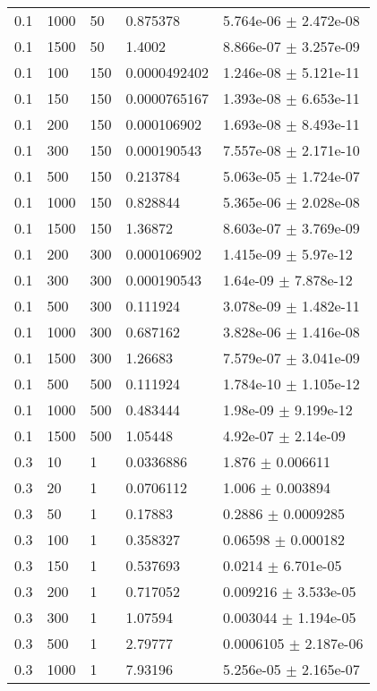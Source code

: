 \begin{longtable}{lllll}
 0.1 &  1000 &    50 & 0.875378 & 5.764e-06 $\pm$ 2.472e-08 \\
 0.1 &  1500 &    50 &   1.4002 & 8.866e-07 $\pm$ 3.257e-09 \\
 0.1 &   100 &   150 & 0.0000492402 & 1.246e-08 $\pm$ 5.121e-11 \\
 0.1 &   150 &   150 & 0.0000765167 & 1.393e-08 $\pm$ 6.653e-11 \\
 0.1 &   200 &   150 & 0.000106902 & 1.693e-08 $\pm$ 8.493e-11 \\
 0.1 &   300 &   150 & 0.000190543 & 7.557e-08 $\pm$ 2.171e-10 \\
 0.1 &   500 &   150 & 0.213784 & 5.063e-05 $\pm$ 1.724e-07 \\
 0.1 &  1000 &   150 & 0.828844 & 5.365e-06 $\pm$ 2.028e-08 \\
 0.1 &  1500 &   150 &  1.36872 & 8.603e-07 $\pm$ 3.769e-09 \\
 0.1 &   200 &   300 & 0.000106902 & 1.415e-09 $\pm$ 5.97e-12 \\
 0.1 &   300 &   300 & 0.000190543 & 1.64e-09 $\pm$ 7.878e-12 \\
 0.1 &   500 &   300 & 0.111924 & 3.078e-09 $\pm$ 1.482e-11 \\
 0.1 &  1000 &   300 & 0.687162 & 3.828e-06 $\pm$ 1.416e-08 \\
 0.1 &  1500 &   300 &  1.26683 & 7.579e-07 $\pm$ 3.041e-09 \\
 0.1 &   500 &   500 & 0.111924 & 1.784e-10 $\pm$ 1.105e-12 \\
 0.1 &  1000 &   500 & 0.483444 & 1.98e-09 $\pm$ 9.199e-12 \\
 0.1 &  1500 &   500 &  1.05448 & 4.92e-07 $\pm$ 2.14e-09 \\
 0.3 &    10 &     1 & 0.0336886 &    1.876 $\pm$ 0.006611 \\
 0.3 &    20 &     1 & 0.0706112 &    1.006 $\pm$ 0.003894 \\
 0.3 &    50 &     1 &  0.17883 &   0.2886 $\pm$ 0.0009285 \\
 0.3 &   100 &     1 & 0.358327 &  0.06598 $\pm$ 0.000182 \\
 0.3 &   150 &     1 & 0.537693 &   0.0214 $\pm$ 6.701e-05 \\
 0.3 &   200 &     1 & 0.717052 & 0.009216 $\pm$ 3.533e-05 \\
 0.3 &   300 &     1 &  1.07594 & 0.003044 $\pm$ 1.194e-05 \\
 0.3 &   500 &     1 &  2.79777 & 0.0006105 $\pm$ 2.187e-06 \\
 0.3 &  1000 &     1 &  7.93196 & 5.256e-05 $\pm$ 2.165e-07 \\

\end{longtable}
